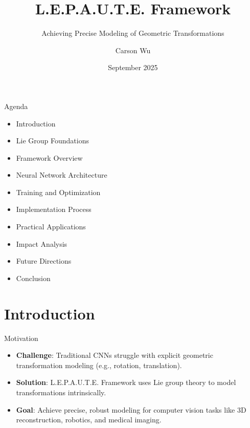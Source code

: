 \documentclass{beamer}
\title{L.E.P.A.U.T.E. Framework}
\subtitle{Achieving Precise Modeling of Geometric Transformations}
\author{Carson Wu}
\date{September 2025}
\begin{document}
\begin{frame}
  \begin{center}
  \end{center}
\end{frame}

\begin{frame}{Agenda}
  \begin{itemize}
    \item<1-> Introduction
    \item<2-> Lie Group Foundations
    \item<3-> Framework Overview
    \item<4-> Neural Network Architecture
    \item<5-> Training and Optimization
    \item<6-> Implementation Process
    \item<7-> Practical Applications
    \item<8-> Impact Analysis
    \item<9-> Future Directions
    \item<10-> Conclusion
  \end{itemize}
\end{frame}

\section{Introduction}
\begin{frame}{Motivation}
  \begin{itemize}
    \item<1-> \textbf{Challenge}: Traditional CNNs struggle with explicit geometric transformation modeling (e.g., rotation, translation).
    \item<2-> \textbf{Solution}: L.E.P.A.U.T.E. Framework uses Lie group theory to model transformations intrinsically.
    \item<3-> \textbf{Goal}: Achieve precise, robust modeling for computer vision tasks like 3D reconstruction, robotics, and medical imaging.
  \end{itemize}
  \begin{center}
  \end{center}
\end{frame}
\end{document}
